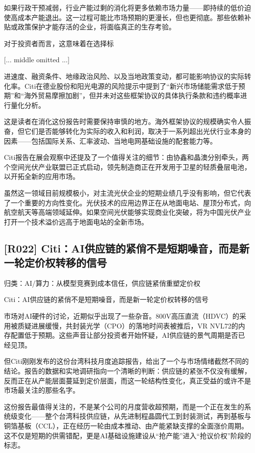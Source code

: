 \documentclass[11pt]{ctexart}
\begin{document}
如果行政干预减弱，行业产能过剩的消化将更多依赖市场力量——即持续的低价迫使高成本产能退出。这一过程可能比市场预期的更漫长，但也更彻底。那些依赖补贴或政策保护才能存活的企业，将面临真正的生存考验。

对于投资者而言，这意味着在选择标

[... middle omitted ...]

进速度、融资条件、地缘政治风险、以及当地政策变动，都可能影响协议的实际转化率。Citi在德业股份和阳光电源的风险提示中提到了“新兴市场储能需求低于预期”和“海外贸易摩擦加剧”，但并未对这些框架协议的具体执行条款和违约概率进行量化分析。

这是读者在消化这份报告时需要保持审慎的地方。海外框架协议的规模确实令人振奋，但它们是否能够转化为实际的收入和利润，取决于一系列超出光伏行业本身的因素——包括国际关系、汇率波动、当地电网基础设施的配套能力等。

Citi报告在展会观察中还提及了一个值得关注的细节：由协鑫和晶澳分别牵头，两个空间光伏产业联盟已正式启动，领先制造商正在开发用于卫星的轻质叠层电池，以开拓全新的应用市场。

虽然这一领域目前规模极小，对主流光伏企业的短期业绩几乎没有影响，但它代表了一个重要的方向性变化。光伏技术的应用边界正在从地面电站、屋顶分布式，向航空航天等高端领域延伸。如果空间光伏能够实现商业化突破，将为中国光伏产业打开一个技术溢价远高于地面电站的全新市场。

\subsection{[R022] Citi：AI供应链的紧俏不是短期噪音，而是新一轮定价权转移的信号}
{\small\color{refgray}归类：AI/算力：从模型竞赛到成本信任，供应链紧俏重塑定价权}

Citi：AI供应链的紧俏不是短期噪音，而是新一轮定价权转移的信号

市场对AI硬件的讨论，近期似乎出现了一些杂音。800V高压直流（HDVC）的采用被质疑进展缓慢，共封装光学（CPO）的落地时间表被推后，VR NVL72的内存配置低于预期。这些声音让部分投资者开始怀疑，AI供应链的景气周期是否已经见顶。

但Citi刚刚发布的这份台湾科技月度追踪报告，给出了一个与市场情绪截然不同的结论。报告的数据和实地调研指向一个清晰的判断：供应链的紧张不仅没有缓解，反而正在从产能层面蔓延到定价层面，而这一轮结构性变化，真正受益的或许不是市场最关注的那些名字。

这份报告最值得关注的，不是某个公司的月度营收超预期，而是一个正在发生的系统级变化——整个台湾科技供应链，从先进制程晶圆代工到封装测试，再到基板与铜箔基板（CCL），正在经历一轮由成本推动、由产能紧缺支撑的全面涨价周期。这不仅是短期的供需错配，更是AI基础设施建设从“抢产能”进入“抢议价权”阶段的标志。
\end{document}
